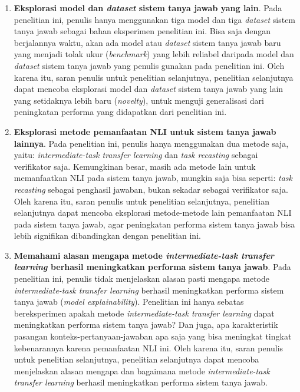 \begin{enumerate}
    \item \textbf{Eksplorasi model dan \emph{dataset} sistem tanya jawab yang lain}. Pada penelitian ini, penulis hanya menggunakan tiga model dan tiga \emph{dataset} sistem tanya jawab sebagai bahan eksperimen penelitian ini. Bisa saja dengan berjalannya waktu, akan ada model atau \emph{dataset} sistem tanya jawab baru yang menjadi tolak ukur (\emph{benchmark}) yang lebih reliabel daripada model dan \emph{dataset} sistem tanya jawab yang penulis gunakan pada penelitian ini. Oleh karena itu, saran penulis untuk penelitian selanjutnya, penelitian selanjutnya dapat mencoba eksplorasi model dan \emph{dataset} sistem tanya jawab yang lain yang setidaknya lebih baru (\emph{novelty}), untuk menguji generalisasi dari peningkatan performa yang didapatkan dari penelitian ini.
    
    \item \textbf{Eksplorasi metode pemanfaatan NLI 
    untuk sistem tanya jawab lainnya}. Pada penelitian ini, penulis hanya menggunakan dua metode saja, yaitu: \emph{intermediate-task transfer learning} dan \emph{task recasting} sebagai verifikator saja. Kemungkinan besar, masih ada metode lain untuk memanfaatkan NLI pada sistem tanya jawab, mungkin saja bisa seperti: \emph{task recasting} sebagai penghasil jawaban, bukan sekadar sebagai verifikator saja. Oleh karena itu, saran penulis untuk penelitian selanjutnya, penelitian selanjutnya dapat mencoba eksplorasi metode-metode lain pemanfaatan NLI pada sistem tanya jawab, agar peningkatan performa sistem tanya jawab bisa lebih signifikan dibandingkan dengan penelitian ini.

    \item \textbf{Memahami alasan mengapa metode \emph{intermediate-task transfer learning} berhasil meningkatkan performa sistem tanya jawab}. Pada penelitian ini, penulis tidak menjelaskan alasan pasti mengapa metode \emph{intermediate-task transfer learning} berhasil meningkatkan performa sistem tanya jawab (\emph{model explainability}). Penelitian ini hanya sebatas bereksperimen apakah metode \emph{intermediate-task transfer learning} dapat meningkatkan performa sistem tanya jawab? Dan juga, apa karakteristik pasangan konteks-pertanyaan-jawaban apa saja yang bisa meningkat tingkat kebenarannya karena pemanfaatan NLI ini. Oleh karena itu, saran penulis untuk penelitian selanjutnya, penelitian selanjutnya dapat mencoba menjelaskan alasan mengapa dan bagaimana metode \emph{intermediate-task transfer learning} berhasil meningkatkan performa sistem tanya jawab.


\end{enumerate}
